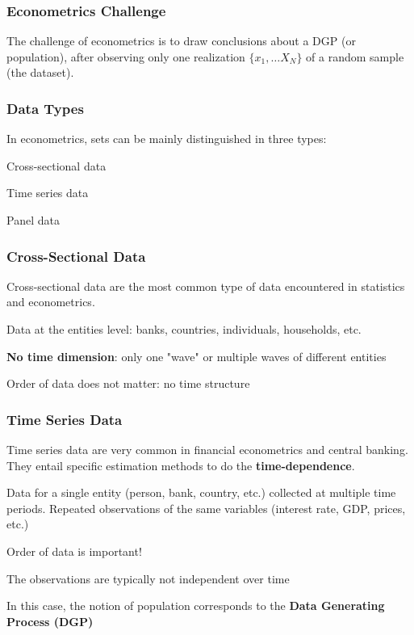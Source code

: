 \documentclass{beamer}
\newenvironment{wideitemize}{\itemize\addtolength{\itemsep}{10pt}}{\enditemize}
\newenvironment{wideenumerate}{\enumerate\addtolength{\itemsep}{10pt}}{\endenumerate}
\begin{document}
\begin{frame}
  \frametitle{Econometrics Challenge}
  The challenge of econometrics is to draw conclusions about a DGP (or population), after observing only one realization $\{x_1, \dots X_N\}$ of a random sample (the dataset).\\

  
\end{frame}


\begin{frame}
  \frametitle{Data Types}

  In econometrics, sets can be mainly distinguished in three types:\\
  \smallskip
  
  \begin{wideenumerate}
    \item Cross-sectional data
    \item Time series data
    \item Panel data
  \end{wideenumerate}
  
\end{frame}

\begin{frame}
  \frametitle{Cross-Sectional Data}
  Cross-sectional data are the most common type of data encountered in statistics and econometrics.\\ 
  \smallskip
  
  \begin{wideitemize}
    \item Data at the entities level: banks, countries, individuals, households, etc.
    \item \textbf{No time dimension}: only one "wave" or multiple waves of different entities
    \item Order of data does not matter: no time structure
  \end{wideitemize}
\end{frame}


\begin{frame}
  \frametitle{Time Series Data}

  Time series data are very common in financial econometrics and central banking. They entail specific estimation methods to do the \textbf{time-dependence}.\\
  
  \begin{wideitemize}
    \item Data for a single entity (person, bank, country, etc.) collected at multiple time periods. Repeated observations of the same variables (interest rate, GDP, prices, etc.)
    \item Order of data is important!
    \item The observations are typically not independent over time
    \item In this case, the notion of population corresponds to the \textbf{Data Generating Process (DGP)} 
  \end{wideitemize}  
\end{frame}
\end{document}
